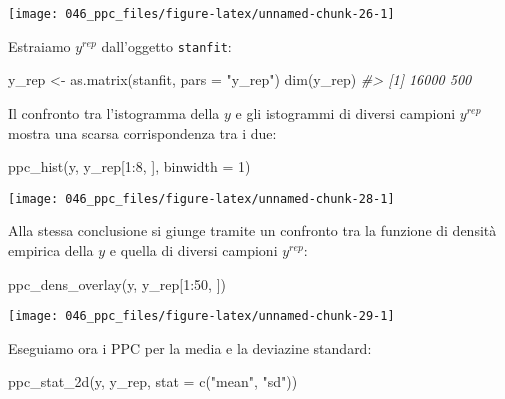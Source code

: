 \documentclass[
]{memoir}
\newenvironment{Shaded}{\begin{snugshade}}{\end{snugshade}}
\newcommand{\AttributeTok}[1]{\textcolor[rgb]{0.77,0.63,0.00}{#1}}
\newcommand{\CommentTok}[1]{\textcolor[rgb]{0.56,0.35,0.01}{\textit{#1}}}
\newcommand{\DecValTok}[1]{\textcolor[rgb]{0.00,0.00,0.81}{#1}}
\newcommand{\FunctionTok}[1]{\textcolor[rgb]{0.00,0.00,0.00}{#1}}
\newcommand{\NormalTok}[1]{#1}
\newcommand{\OtherTok}[1]{\textcolor[rgb]{0.56,0.35,0.01}{#1}}
\newcommand{\SpecialCharTok}[1]{\textcolor[rgb]{0.00,0.00,0.00}{#1}}
\newcommand{\StringTok}[1]{\textcolor[rgb]{0.31,0.60,0.02}{#1}}
\theoremstyle{definition}
\theoremstyle{definition}
\theoremstyle{definition}
\theoremstyle{definition}
\theoremstyle{remark}
\begin{document}
\begin{center}\texttt{[image: 046\_ppc\_files/figure-latex/unnamed-chunk-26-1]} \end{center}

\noindent
Estraiamo \(y^{rep}\) dall'oggetto \texttt{stanfit}:

\begin{Shaded}
\begin{Highlighting}[]
\NormalTok{y\_rep }\OtherTok{\textless{}{-}} \FunctionTok{as.matrix}\NormalTok{(stanfit, }\AttributeTok{pars =} \StringTok{"y\_rep"}\NormalTok{)}
\FunctionTok{dim}\NormalTok{(y\_rep) }
\CommentTok{\#\textgreater{} [1] 16000   500}
\end{Highlighting}
\end{Shaded}

Il confronto tra l'istogramma della \(y\) e gli istogrammi di diversi campioni \(y^{rep}\) mostra una scarsa corrispondenza tra i due:

\begin{Shaded}
\begin{Highlighting}[]
\FunctionTok{ppc\_hist}\NormalTok{(y, y\_rep[}\DecValTok{1}\SpecialCharTok{:}\DecValTok{8}\NormalTok{, ], }\AttributeTok{binwidth =} \DecValTok{1}\NormalTok{)}
\end{Highlighting}
\end{Shaded}

\begin{center}\texttt{[image: 046\_ppc\_files/figure-latex/unnamed-chunk-28-1]} \end{center}

Alla stessa conclusione si giunge tramite un confronto tra la funzione di densità empirica della \(y\) e quella di diversi campioni \(y^{rep}\):

\begin{Shaded}
\begin{Highlighting}[]
\FunctionTok{ppc\_dens\_overlay}\NormalTok{(y, y\_rep[}\DecValTok{1}\SpecialCharTok{:}\DecValTok{50}\NormalTok{, ])}
\end{Highlighting}
\end{Shaded}

\begin{center}\texttt{[image: 046\_ppc\_files/figure-latex/unnamed-chunk-29-1]} \end{center}

Eseguiamo ora i PPC per la media e la deviazine standard:

\begin{Shaded}
\begin{Highlighting}[]
\FunctionTok{ppc\_stat\_2d}\NormalTok{(y, y\_rep, }\AttributeTok{stat =} \FunctionTok{c}\NormalTok{(}\StringTok{"mean"}\NormalTok{, }\StringTok{"sd"}\NormalTok{))}
\end{Highlighting}
\end{Shaded}
\end{document}
